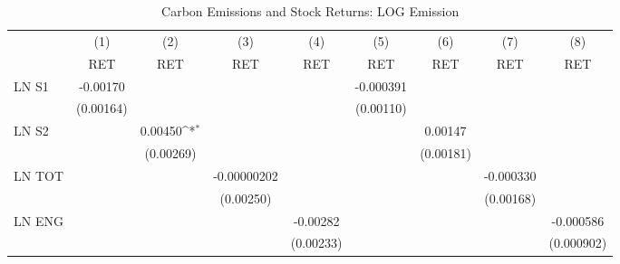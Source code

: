 \begin{table}[htbp]\centering
\def\sym#1{\ifmmode^{#1}\else\(^{#1}\)\fi}
\caption{Carbon Emissions and Stock Returns: LOG Emission}
\begin{tabular}{l*{8}{c}}
\hline\hline
                    &\multicolumn{1}{c}{(1)}&\multicolumn{1}{c}{(2)}&\multicolumn{1}{c}{(3)}&\multicolumn{1}{c}{(4)}&\multicolumn{1}{c}{(5)}&\multicolumn{1}{c}{(6)}&\multicolumn{1}{c}{(7)}&\multicolumn{1}{c}{(8)}\\
                    &\multicolumn{1}{c}{RET}&\multicolumn{1}{c}{RET}&\multicolumn{1}{c}{RET}&\multicolumn{1}{c}{RET}&\multicolumn{1}{c}{RET}&\multicolumn{1}{c}{RET}&\multicolumn{1}{c}{RET}&\multicolumn{1}{c}{RET}\\
\hline
LN S1               &    -0.00170         &                     &                     &                     &   -0.000391         &                     &                     &                     \\
                    &   (0.00164)         &                     &                     &                     &   (0.00110)         &                     &                     &                     \\
LN S2               &                     &     0.00450\sym{*}  &                     &                     &                     &     0.00147         &                     &                     \\
                    &                     &   (0.00269)         &                     &                     &                     &   (0.00181)         &                     &                     \\
LN TOT              &                     &                     & -0.00000202         &                     &                     &                     &   -0.000330         &                     \\
                    &                     &                     &   (0.00250)         &                     &                     &                     &   (0.00168)         &                     \\
LN ENG              &                     &                     &                     &    -0.00282         &                     &                     &                     &   -0.000586         \\
                    &                     &                     &                     &   (0.00233)         &                     &                     &                     &  (0.000902)         \\

\end{tabular}
\end{table}
